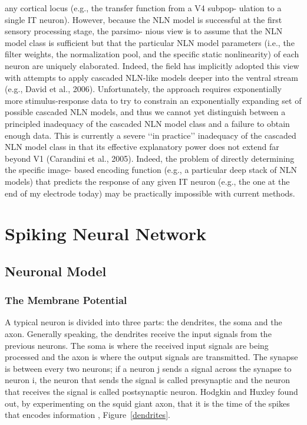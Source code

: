 any cortical locus (e.g., the transfer function from a V4 subpop-
ulation to a single IT neuron). However, because the NLN model
is successful at the first sensory processing stage, the parsimo-
nious view is to assume that the NLN model class is sufficient but
that the particular NLN model parameters (i.e., the filter weights,
the normalization pool, and the specific static nonlinearity) of
each neuron are uniquely elaborated. Indeed, the field has
implicitly adopted this view with attempts to apply cascaded
NLN-like models deeper into the ventral stream (e.g., David
et al., 2006). Unfortunately, the approach requires exponentially
more stimulus-response data to try to constrain an exponentially
expanding set of possible cascaded NLN models, and thus we cannot yet distinguish between a principled inadequacy of the
cascaded NLN model class and a failure to obtain enough
data. This is currently a severe ‘‘in practice’’ inadequacy of the
cascaded NLN model class in that its effective explanatory
power does not extend far beyond V1 (Carandini et al., 2005).
Indeed, the problem of directly determining the specific image-
based encoding function (e.g., a particular deep stack of NLN
models) that predicts the response of any given IT neuron
(e.g., the one at the end of my electrode today) may be practically
impossible with current methods.

\section{Spiking Neural Network}
\label{sec:pgr}
\subsection{Neuronal Model}
\subsubsection{The Membrane Potential}
A typical neuron is divided into three parts: the dendrites, the soma and the axon. Generally speaking, the dendrites receive the input signals from the previous neurons. The soma is where the received input signals are being processed and the axon is where the output signals are transmitted. The synapse is between every two neurons; if a neuron j sends a signal across the synapse to neuron i, the neuron that sends the signal is called presynaptic and the neuron that receives the signal is called postsynaptic neuron. 
Hodgkin and Huxley \cite{hhmodel} found out, by experimenting on the squid giant axon, that it is the time of the spikes that encodes information \cite{pnn}, Figure~\ref{dendrites}.
 
